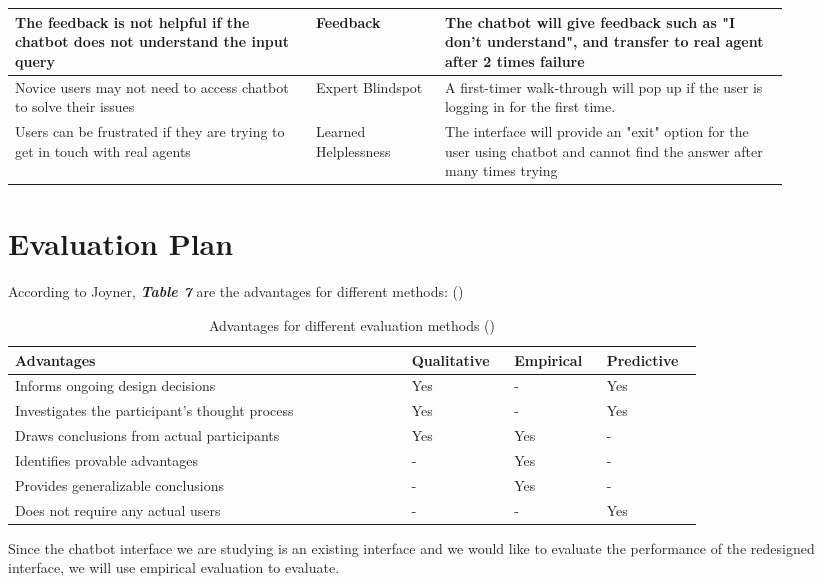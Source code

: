 \documentclass[
	letterpaper, %
]{jdf}
\begin{document}
\begin{table}[hbt!]
\begin{tabular}{L{0.35\linewidth} L{0.15\linewidth} L{0.4\linewidth}}
		The feedback is not helpful if the chatbot does not understand the input query & Feedback & The chatbot will give feedback such as "I don't understand", and transfer to real agent after 2 times failure \\
		\midrule
		Novice users may not need to access chatbot to solve their issues & Expert Blindspot  & A first-timer walk-through will pop up if the user is logging in for the first time. \\
		\midrule
		Users can be frustrated if they are trying to get in touch with real agents & Learned Helplessness & The interface will provide an "exit" option for the user using chatbot and cannot find the answer after many times trying \\
	\end{tabular}
\end{table}
\clearpage

\section{Evaluation Plan}
According to Joyner, \textit{\textbf{Table 7}} are the advantages for different methods: (\cite{joyner2016a})

\begin{table}[hbt!]
	\caption{Advantages for different evaluation methods (\cite{joyner2016a})}
	\small %
	\centering %
	\begin{tabular}{L{0.5\linewidth} L{0.1\linewidth} L{0.1\linewidth} L{0.1\linewidth}}
		\textbf{Advantages} & \textbf{Qualitative} & \textbf{Empirical} & \textbf{Predictive}\\
		\toprule[0.5pt]
		Informs ongoing design decisions & Yes & - & Yes \\
		\midrule
		Investigates the participant's thought process & Yes & - & Yes \\
		\midrule
		Draws conclusions from actual participants & Yes & Yes & - \\
		\midrule
		Identifies provable advantages & - & Yes & - \\
		\midrule
		Provides generalizable conclusions & - & Yes & - \\
		\midrule
		Does not require any actual users & - & - & Yes \\
	\end{tabular}
\end{table}

Since the chatbot interface we are studying is an existing interface and we would like to evaluate the performance of the redesigned interface, we will use empirical evaluation to evaluate.
\end{document}
